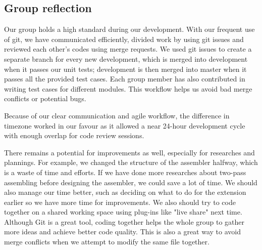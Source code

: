 \documentclass[11pt]{article}
\begin{document}
\subsection{Group reflection}
\begin{flushleft}
Our group holds a high standard during our development. With our frequent use of git, we have communicated efficiently, divided work by using git issues and reviewed each other's codes using merge requests. We used git issues to create a separate branch for every new development, which is merged into development when it passes our unit tests; development is then merged into master when it passes all the provided test cases. Each group member has also contributed in writing test cases for different modules. This workflow helps us avoid bad merge conflicts or potential bugs. 
\end{flushleft}

\begin{flushleft}
Because of our clear communication and agile workflow, the difference in timezone worked in our favour as it allowed a near 24-hour development cycle with enough overlap for code review sessions. 
\end{flushleft}

\begin{flushleft}
There remains a potential for improvements as well, especially for researches and plannings. For example, we changed the structure of the assembler halfway, which is a waste of time and efforts. If we have done more researches about two-pass assembling before designing the assembler, we could save a lot of time. We should also manage our time better, such as deciding on what to do for the extension earlier so we have more time for improvements. We also should try to code together on a shared working space using plug-ins like "live share" next time. Although Git is a great tool, coding together helps the whole group to gather more ideas and achieve better code quality. This is also a great way to avoid merge conflicts when we attempt to modify the same file together.
\end{flushleft}

\end{document}
